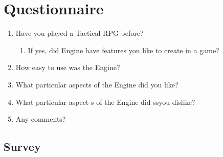 
\section{Questionnaire}
\label{Questionnaire}
\begin{enumerate}
	\item Have you played a Tactical RPG before?
	\begin{enumerate}
		\item If yes, did Engine have features you like to create in a game?
	\end{enumerate}
	\item How easy to use was the Engine?
	\item What particular aspects of the Engine did you like? 
	\item What particular aspect s of the Engine did ssyou dislike? 
	\item Any comments?
\end{enumerate}

\subsection{Survey}








